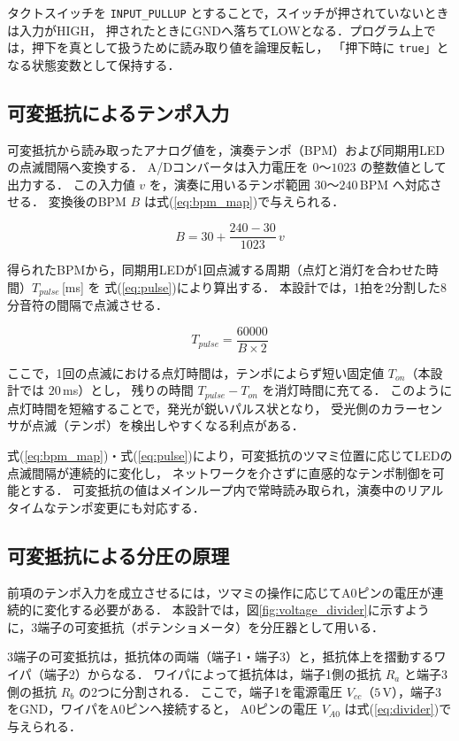\documentclass[lualatex,book,openany,paper=a4paper,jafontsize=11.5pt,jafontscale=1.05]{jlreq}
\begin{document}
タクトスイッチを \texttt{INPUT\_PULLUP} とすることで，スイッチが押されていないときは入力がHIGH，
押されたときにGNDへ落ちてLOWとなる．プログラム上では，押下を真として扱うために読み取り値を論理反転し，
「押下時に \texttt{true}」となる状態変数として保持する．

\subsection{可変抵抗によるテンポ入力}
可変抵抗から読み取ったアナログ値を，演奏テンポ（BPM）および同期用LEDの点滅間隔へ変換する．
A/Dコンバータは入力電圧を $0$〜$1023$ の整数値として出力する．
この入力値 $v$ を，演奏に用いるテンポ範囲 $30$〜$240$\,BPM へ対応させる．
変換後のBPM $B$ は式(\ref{eq:bpm_map})で与えられる．

\begin{equation}
  B = 30 + \frac{240 - 30}{1023}\, v
  \label{eq:bpm_map}
\end{equation}

得られたBPMから，同期用LEDが1回点滅する周期（点灯と消灯を合わせた時間）$T_{pulse}$\,[ms] を
式(\ref{eq:pulse})により算出する．
本設計では，1拍を2分割した8分音符の間隔で点滅させる．

\begin{equation}
  T_{pulse} = \frac{60000}{B \times 2}
  \label{eq:pulse}
\end{equation}

ここで，1回の点滅における点灯時間は，テンポによらず短い固定値 $T_{on}$（本設計では $20$\,ms）とし，
残りの時間 $T_{pulse} - T_{on}$ を消灯時間に充てる．
このように点灯時間を短縮することで，発光が鋭いパルス状となり，
受光側のカラーセンサが点滅（テンポ）を検出しやすくなる利点がある．

式(\ref{eq:bpm_map})・式(\ref{eq:pulse})により，可変抵抗のツマミ位置に応じてLEDの点滅間隔が連続的に変化し，
ネットワークを介さずに直感的なテンポ制御を可能とする．
可変抵抗の値はメインループ内で常時読み取られ，演奏中のリアルタイムなテンポ変更にも対応する．

\subsection{可変抵抗による分圧の原理}
\label{subsec:voltage_divider}
前項のテンポ入力を成立させるには，ツマミの操作に応じてA0ピンの電圧が連続的に変化する必要がある．
本設計では，図\ref{fig:voltage_divider}に示すように，3端子の可変抵抗（ポテンショメータ）を分圧器として用いる．

3端子の可変抵抗は，抵抗体の両端（端子1・端子3）と，抵抗体上を摺動するワイパ（端子2）からなる．
ワイパによって抵抗体は，端子1側の抵抗 $R_{a}$ と端子3側の抵抗 $R_{b}$ の2つに分割される．
ここで，端子1を電源電圧 $V_{cc}$（$5$\,V），端子3をGND，ワイパをA0ピンへ接続すると，
A0ピンの電圧 $V_{A0}$ は式(\ref{eq:divider})で与えられる．
\end{document}
